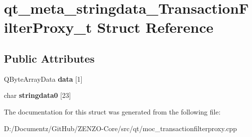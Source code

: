 \hypertarget{structqt__meta__stringdata___transaction_filter_proxy__t}{}\section{qt\+\_\+meta\+\_\+stringdata\+\_\+\+Transaction\+Filter\+Proxy\+\_\+t Struct Reference}
\label{structqt__meta__stringdata___transaction_filter_proxy__t}
\subsection*{Public Attributes}
\begin{DoxyCompactItemize}
\item 
\mbox{\label{structqt__meta__stringdata___transaction_filter_proxy__t_a735a160e574302609d4abd5e433b43d7}} 
Q\+Byte\+Array\+Data {\bfseries data} \mbox{[}1\mbox{]}
\item 
\mbox{\label{structqt__meta__stringdata___transaction_filter_proxy__t_a521eaf4e1663f80799724c3d91da932d}} 
char {\bfseries stringdata0} \mbox{[}23\mbox{]}
\end{DoxyCompactItemize}


The documentation for this struct was generated from the following file\+:\begin{DoxyCompactItemize}
\item 
D\+:/\+Documentz/\+Git\+Hub/\+Z\+E\+N\+Z\+O-\/\+Core/src/qt/moc\+\_\+transactionfilterproxy.\+cpp\end{DoxyCompactItemize}
